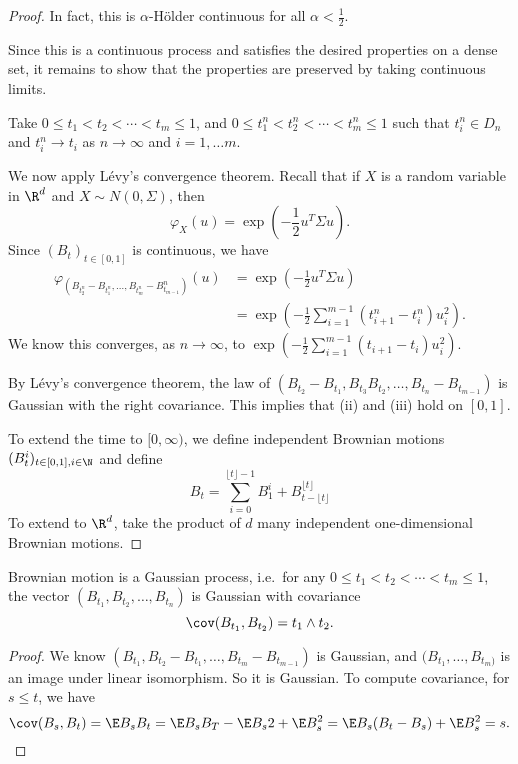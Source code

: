 \documentclass[a4paper]{article}
\begin{document}
\begin{proof}
  In fact, this is $\alpha$-H\"older continuous for all $\alpha < \frac{1}{2}$.

  Since this is a continuous process and satisfies the desired properties on a dense set, it remains to show that the properties are preserved by taking continuous limits.

  Take $0 \leq t_1 < t_2 < \cdots < t_m \leq 1$, and $0 \leq t_1^n < t_2^n < \cdots < t_m^n \leq 1$ such that $t_i^n \in D_n$ and $t_i^n \to t_i$ as $n \to \infty$ and $i = 1, \ldots m$.

  We now apply L\'evy's convergence theorem. Recall that if $X$ is a random variable in $\R^d$ and $X \sim N(0, \Sigma)$, then
  \[
    \varphi_X (u) = \exp\left(-\frac{1}{2} u^T \Sigma u\right).
  \]
  Since $(B_t)_{t \in [0, 1]}$ is continuous, we have
  \begin{align*}
    \varphi_{(B_{t_2^n} - B_{t_1^n}, \ldots, B_{t_m^n} - B_{t_{m - 1}}^n)}(u) &= \exp \left(- \frac{1}{2} u^T \Sigma u\right)\\
    &= \exp \left(-\frac{1}{2} \sum_{i = 1}^{m - 1} (t_{i + 1}^n - t_i^n) u_i^2\right).
  \end{align*}
  We know this converges, as $n \to \infty$, to $\exp \left(-\frac{1}{2} \sum_{i = 1}^{m - 1} (t_{i + 1} - t_i) u_i^2\right)$.

  By L\'evy's convergence theorem, the law of $(B_{t_2} - B_{t_1}, B_{t_3} B_{t_2}, \ldots, B_{t_n} - B_{t_{m - 1}})$ is Gaussian with the right covariance. This implies that (ii) and (iii) hold on $[0, 1]$.

  To extend the time to $[0, \infty)$, we define independent Brownian motions $(B_t^i)_{t \in [0, 1], i \in \N}$ and define
  \[
    B_t = \sum_{i = 0}^{\lfloor t\rfloor - 1} B_1^i + B^{\lfloor t\rfloor}_{t - \lfloor t \rfloor}
  \]
  To extend to $\R^d$, take the product of $d$ many independent one-dimensional Brownian motions.
\end{proof}

\begin{lemma}
  Brownian motion is a Gaussian process, i.e.\ for any $0 \leq t_1 < t_2 < \cdots < t_m \leq 1$, the vector $(B_{t_1}, B_{t_2}, \ldots, B_{t_n})$ is Gaussian with covariance
  \[
    \cov(B_{t_1}, B_{t_2}) = t_1 \wedge t_2.
  \]
\end{lemma}

\begin{proof}
  We know $(B_{t_1}, B_{t_2} - B_{t_1}, \ldots, B_{t_m} - B_{t_{m - 1}})$ is Gaussian, and $(B_{t_1}, \ldots, B_{t_m)}$ is an image under linear isomorphism. So it is Gaussian. To compute covariance, for $s \leq t$, we have
  \[
    \cov(B_s, B_t) = \E B_s B_t = \E B_s B_T - \E B_s2 + \E B_s^2 = \E B_s(B_t - B_s) + \E B_s^2 = s.
  \]
\end{proof}
\end{document}
